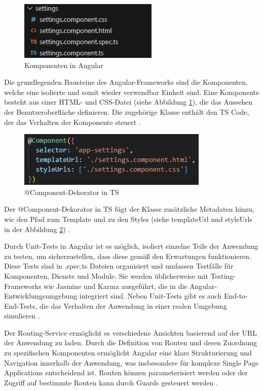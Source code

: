 \begin{figure}[h]
    \centering
    \includegraphics[clip,width=0.5\linewidth]{images/Komponente.png}
    \caption[Komponenten in Angular]{Komponenten in Angular}
    \label{KomponentenAngular}
\end{figure}

Die grundlegenden Bausteine des Angular-Frameworks sind die Komponenten, welche eine isolierte und somit wieder verwendbar Einheit sind. 
Eine Komponente besteht aus einer HTML- und CSS-Datei (siehe Abbildung \ref{KomponentenAngular}), die das Aussehen der Benutzeroberfläche definieren. Die zugehörige Klasse enthält den TS Code, der das Verhalten der Komponente steuert \cite{angular_arch}.

\begin{figure}[h]
    \centering
    \includegraphics[clip,width=0.5\linewidth]{images/@Component.png}
    \caption[@Component-Dekorator in TypeScript]{@Component-Dekorator in TS}
    \label{Component}
\end{figure}

Der @Component-Dekorator in TS fügt der Klasse zusätzliche Metadaten hinzu, wie den Pfad zum Template und zu den Styles (siehe templateUrl und styleUrls in der Abbildung \ref{Component}) \cite{angular_arch}.

Durch Unit-Tests in Angular ist es möglich, isoliert einzelne Teile der Anwendung zu testen, um sicherzustellen, dass diese gemäß den Erwartungen funktionieren. 
Diese Tests sind in .spec.ts Dateien organisiert und umfassen Testfälle für Komponenten, Dienste und Module. 
Sie werden üblicherweise mit Testing-Frameworks wie Jasmine und Karma ausgeführt, die in die Angular-Entwicklungsumgebung integriert sind. 
Neben Unit-Tests gibt es auch End-to-End-Tests, die das Verhalten der Anwendung in einer realen Umgebung simulieren \cite[S.340 ff.]{angular_testing}.

Der Routing-Service ermöglicht es verschiedene Ansichten basierend auf der URL der Anwendung zu laden. 
Durch die Definition von Routen und deren Zuordnung zu spezifischen Komponenten ermöglicht Angular eine klare Strukturierung und Navigation innerhalb der Anwendung, was insbesondere für komplexe Single Page Applications entscheidend ist. 
Routen können parameterisiert werden oder der Zugriff auf bestimmte Routen kann durch Guards gesteuert werden \cite{angular_routes}.

